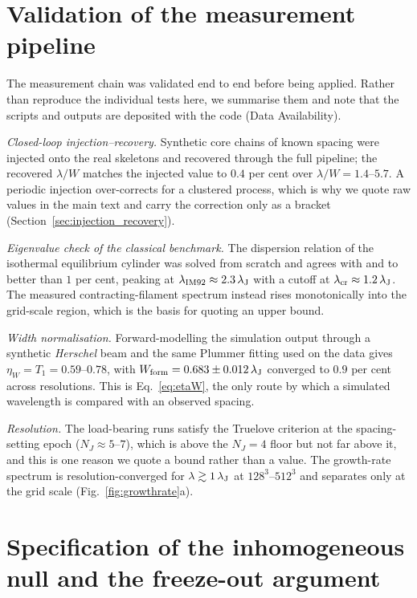 \documentclass[usenatbib,twoside,twocolumn]{mnras}
\begin{document}
\section{Validation of the measurement pipeline}
\label{sec:validation}

The measurement chain was validated end to end before being applied. Rather than reproduce the individual tests here, we summarise them and note that the scripts and outputs are deposited with the code (Data Availability).

\emph{Closed-loop injection--recovery.} Synthetic core chains of known spacing were injected onto the real skeletons and recovered through the full pipeline; the recovered $\lambda/W$ matches the injected value to $0.4$ per cent over $\lambda/W=1.4$--$5.7$. A periodic injection over-corrects for a clustered process, which is why we quote raw values in the main text and carry the correction only as a bracket (Section~\ref{sec:injection_recovery}).

\emph{Eigenvalue check of the classical benchmark.} The dispersion relation of the isothermal equilibrium cylinder was solved from scratch and agrees with \citet{Nagasawa1987} and \citet{Fischera2012} to better than $1$ per cent, peaking at $\lambda_{\rm IM92}\approx2.3\,\lambda_{\rm J}$ with a cutoff at $\lambda_{\rm cr}\approx1.2\,\lambda_{\rm J}$. The measured contracting-filament spectrum instead rises monotonically into the grid-scale region, which is the basis for quoting an upper bound.

\emph{Width normalisation.} Forward-modelling the simulation output through a synthetic \textit{Herschel} beam and the same Plummer fitting used on the data gives $\eta_W=T_1=0.59$--$0.78$, with $W_{\rm form}=0.683\pm0.012\,\lambda_{\rm J}$ converged to $0.9$ per cent across resolutions. This is Eq.~\ref{eq:etaW}, the only route by which a simulated wavelength is compared with an observed spacing.

\emph{Resolution.} The load-bearing runs satisfy the Truelove criterion at the spacing-setting epoch ($N_J\approx5$--$7$), which is above the $N_J=4$ floor but not far above it, and this is one reason we quote a bound rather than a value. The growth-rate spectrum is resolution-converged for $\lambda\gtrsim1\,\lambda_{\rm J}$ at $128^3$--$512^3$ and separates only at the grid scale (Fig.~\ref{fig:growthrate}a).

\section{Specification of the inhomogeneous null and the freeze-out argument}
\label{sec:nullspec}
\end{document}
